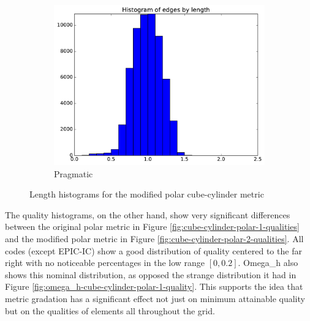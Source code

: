 \documentclass[3p,times,procedia,number]{elsarticle}
\begin{document}
\begin{figure}
\begin{subfigure}{.4\textwidth}
\includegraphics[width=\textwidth]{pragmatic-cube-cylinder-polar-2-length.pdf}
\caption{Pragmatic}
\end{subfigure}
\caption{Length histograms for the modified polar cube-cylinder metric}
\label{fig:cube-cylinder-polar-2-lengths}
\end{figure}

The quality histograms, on the other hand, show very significant differences
between the original polar metric in Figure \ref{fig:cube-cylinder-polar-1-qualities}
and the modified polar metric in Figure \ref{fig:cube-cylinder-polar-2-qualities}.
All codes (except EPIC-IC) show a good distribution of quality centered to the
far right with no noticeable percentages in the low range $[0,0.2]$.
Omega\_h also shows this nominal distribution, as opposed the strange distribution
it had in Figure \ref{fig:omega_h-cube-cylinder-polar-1-quality}.
This supports the idea that metric gradation has a significant effect not just
on minimum attainable quality but on the qualities of elements all throughout the grid.
\end{document}
